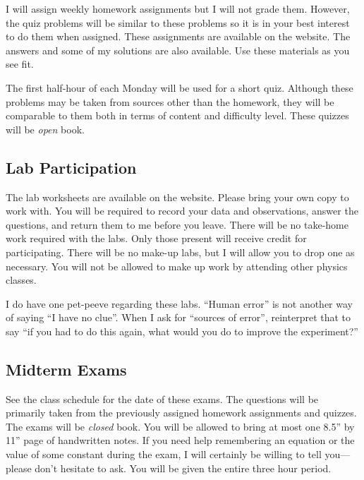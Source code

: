 \documentclass{article}
\begin{document}
I will assign weekly homework assignments but I will not grade them. However, the quiz problems will be similar to these problems so it is in your best interest to do them when assigned. These assignments are available on the website. The answers and some of my solutions are also available. Use these materials as you see fit.

The first half-hour of each Monday will be used for a short quiz. Although these problems may be taken from sources other than the homework, they will be comparable to them both in terms of content and difficulty level. These quizzes will be \emph{open} book.


\subsection{Lab Participation%
  \label{lab-participation}%
}

The lab worksheets are available on the website. Please bring your own copy to work with. You will be required to record your data and observations, answer the questions, and return them to me before you leave. There will be no take-home work required with the labs. Only those present will receive credit for participating. There will be no make-up labs, but I will allow you to drop one as necessary. You will not be allowed to make up work by attending other physics classes.

I do have one pet-peeve regarding these labs. ``Human error'' is not another way of saying ``I have no clue''. When I ask for ``sources of error'', reinterpret that to say ``if you had to do this again, what would you do to improve the experiment?''


\subsection{Midterm Exams%
  \label{midterm-exams}%
}

See the class schedule for the date of these exams. The questions will be primarily taken from the previously assigned homework assignments and quizzes. The exams will be \emph{closed} book. You will be allowed to bring at most one 8.5'' by 11'' page of handwritten notes. If you need help remembering an equation or the value of some constant during the exam, I will certainly be willing to tell you---please don't hesitate to ask. You will be given the entire three hour period.

\clearpage
\end{document}
